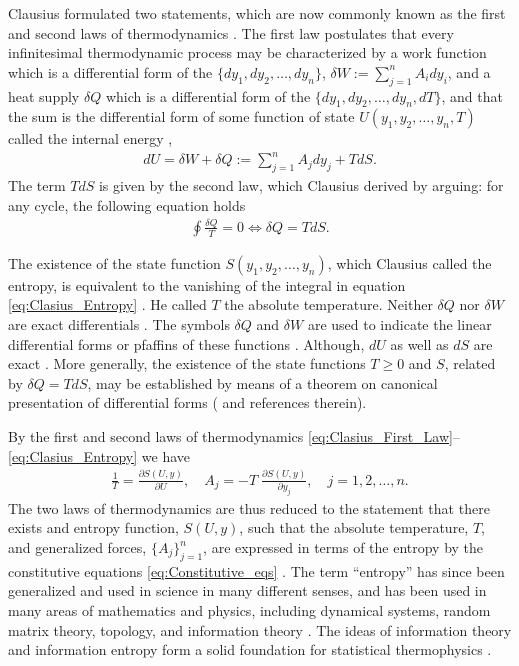 \documentclass[english,12pt]{ttuthes}
\begin{document}
Clausius formulated two statements, which are now commonly known as
the first and second laws of thermodynamics \cite{Berdichevsky-1997}. The
first law postulates that every infinitesimal thermodynamic process may
be characterized by a work function which is a differential form
of the $\{dy_1,dy_2,\ldots,dy_n\}$, $\delta W:=\sum_{j=1}^nA_idy_i$, and a heat supply
$\delta Q$ which is a differential form of the $\{dy_1,dy_2,\ldots,dy_n,dT\}$, and that
the sum is the differential form of some function of state
$U(y_1,y_2,\ldots,y_n,T)$ called the internal energy
\cite{Berdichevsky-1997,Thompson-1988,Bobbio-2000,Robertson-1993},
%
\begin{align}\label{eq:Clasius_First_Law}
  dU=\delta W+\delta Q:=\sum_{j=1}^nA_jdy_j+TdS.
\end{align}
%
The term $TdS$ is given by the second law, which Clausius derived by 
arguing: for any cycle, the following equation holds
\cite{Berdichevsky-1997} 
%
\begin{align}\label{eq:Clasius_Entropy}
  \oint\frac{\delta Q}{T}=0 \iff \delta Q=TdS.
\end{align}
%

The existence of the state function $S(y_1,y_2,\ldots,y_n)$, which Clausius
called the entropy, is equivalent to the vanishing of the integral in
equation \eqref{eq:Clasius_Entropy} \cite{Berdichevsky-1997}. He called $T$
the absolute temperature. Neither $\delta Q$ nor $\delta W$ are exact differentials
\cite{Thompson-1988,Bobbio-2000,Berdichevsky-1997}. The symbols
$\delta Q$ and $\delta W$ are used to indicate the linear differential forms or
pfaffins of these functions \cite{Bobbio-2000}. Although, $dU$ as well
as $dS$ are exact \cite{Bobbio-2000}. More generally, the existence of
the state functions $T\geq0$ and $S$, related by $\delta Q=TdS$, may be 
established by means of a theorem on canonical presentation of
differential forms (\cite{Berdichevsky-1997} and references therein).

By the first and second laws of thermodynamics
\eqref{eq:Clasius_First_Law}--\eqref{eq:Clasius_Entropy} we have   
%
\begin{align}\label{eq:Constitutive_eqs}
  \frac{1}{T}=\frac{\partial S(U,y)}{\partial U}, \quad
  A_j=-T\;\frac{\partial S(U,y)}{\partial y_j}, \quad j=1,2,\ldots,n.
\end{align}
%
The two laws of thermodynamics are thus reduced to the statement that
there exists and entropy function, $S(U,y)$, such that the absolute
temperature, $T$, and generalized forces, $\{A_j\}_{j=1}^n$, are expressed in terms
of the entropy by the constitutive equations
\eqref{eq:Constitutive_eqs} \cite{Berdichevsky-1997}. The term
``entropy'' has since been generalized and used in science in many
different senses, and has been used in many areas of mathematics and
physics, including dynamical systems, random matrix theory, topology,
and information theory
\cite{Martin-1981,Abul-Magd:j-PLA:2007,Sethna-2006}. The ideas of
information theory and information entropy form a solid foundation for
statistical thermophysics \cite{Robertson-1993}. 
\end{document}
